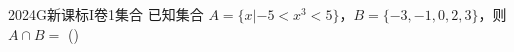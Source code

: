 
\begin{problem}{2024}{G}{新课标I卷}{1}{集合}
已知集合 $A=\{x|-5<x^3<5\}$，$B=\{-3,-1,0,2,3\}$，则 $A\cap B=$
(\hspace{1cm})
\begin{choices}
\end{choices}
\end{problem}